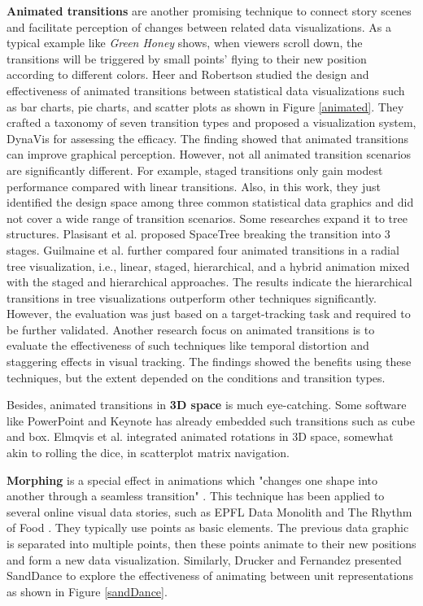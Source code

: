 \textbf{Animated transitions} are another promising technique to connect story scenes and facilitate perception of changes between related data visualizations.  As a typical example like \textit{Green Honey} \cite{honey} shows, when viewers scroll down, the transitions will be triggered by small points' flying to their new position according to different colors. Heer and Robertson \cite{Heer2007} studied the design and effectiveness of animated transitions between statistical data visualizations such as bar charts, pie charts, and scatter plots as shown in Figure \ref{animated}. They crafted a taxonomy of seven transition types and proposed a visualization system, DynaVis for assessing the efficacy. The finding showed that animated transitions can improve graphical perception. However, not all animated transition scenarios are significantly different. For example, staged transitions only gain modest performance compared with linear transitions. Also, in this work, they just identified the design space among three common statistical data graphics and did not cover a wide range of transition scenarios. Some researches expand it to tree structures. Plasisant et al. \cite{Plaisant2002} proposed SpaceTree breaking the transition into 3 stages. Guilmaine et al. \cite{Guilmaine2012} further compared four animated transitions in a radial tree visualization, i.e., linear, staged, hierarchical, and a hybrid animation mixed with the staged and hierarchical approaches. The results indicate the hierarchical transitions in tree visualizations outperform other techniques significantly. However, the evaluation was just based on a target-tracking task and required to be further validated. Another research focus on animated transitions is to evaluate the effectiveness of  such techniques like temporal distortion \cite{Dragicevic2011} and staggering effects \cite{Chevalier2014} in visual tracking. The findings showed the benefits using these techniques, but the extent depended on the conditions and transition types.

Besides, animated transitions in \textbf{3D space} is much eye-catching. Some software like PowerPoint and Keynote has already embedded such transitions such as cube and box. Elmqvis et al. \cite{Elmqvist2008a} integrated animated rotations in 3D space, somewhat akin to rolling the dice, in scatterplot matrix navigation. 

\textbf{Morphing} is a special effect in animations which "changes one shape into another through a seamless transition" \cite{morphing}. This technique has been applied to several online visual data stories, such as EPFL Data Monolith \cite{EPFL} and The Rhythm of Food \cite{food}. They typically use points as basic elements. The previous data graphic is separated into multiple points, then these points animate to their new positions and form a new data visualization. Similarly, Drucker and Fernandez \cite{Drucker2015, Park2018} presented SandDance to explore the effectiveness of animating between unit representations as shown in Figure \ref{sandDance}.  

